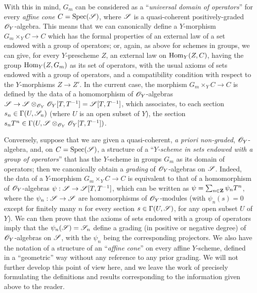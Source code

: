 \begin{remark}[8.3.9]
With this in mind, $G_m$ can be considered as a ``\emph{universal domain of operators}'' for every \emph{affine cone} $C=\operatorname{Spec}(\mathscr{S})$, where $\mathscr{S}$ is a quasi-coherent positively-graded $\mathscr{O}_Y$-algebra.
This means that we can canonically define a $Y$-morphism $G_m\times_Y C\to C$ which has the formal properties of an external law of a set endowed with a group of operators;
or, again, as above for schemes in groups, we can give, for every $Y$-prescheme $Z$, an external law on $\operatorname{Hom}_Y(Z,C)$, having the group $\operatorname{Hom}_Y(Z,G_m)$ as its set of operators, with the usual axioms of sets endowed with a group of operators, and a compatibility condition with respect to the $Y$-morphisms $Z\to Z'$.
In the current case, the morphism $G_m\times_Y C\to C$ is defined by the data of a homomorphism of $\mathscr{O}_Y$-algebras $\sh{S} \to \sh{S}\otimes_{\sh{O}_Y}\sh{O}_Y[T,T^{-1}] = \sh{S}[T,T^{-1}]$, which associates, to each section $s_n\in\Gamma(U,\mathscr{S}_n)$ (where $U$ is an open subset of $Y$), the section $s_n T^n\in\Gamma(U,\mathscr{S}\otimes_{\mathscr{O}_Y}\mathscr{O}_Y[T,T^{-1}])$.

Conversely, suppose that we are given a quasi-coherent, \emph{a priori non-graded}, $\mathscr{O}_Y$-algebra, and, on $C=\operatorname{Spec}(\mathscr{S})$, a structure of a ``\emph{$Y$-scheme in sets endowed with a group of operators}'' that has the $Y$-scheme in groups $G_m$ as its domain of operators;
then we canonically obtain a \emph{grading} of $\mathscr{O}_Y$-algebras on $\mathscr{S}$.
Indeed, the data of a $Y$-morphism $G_m\times_Y C\to C$ is equivalent to that of a homomorphism of $\mathscr{O}_Y$-algebras $\psi:\sh{S}\to\sh{S}[T,T^{-1}]$, which can be written as $\psi=\sum_{n\in\mathbf{Z}}\psi_n T^n$, where the $\psi_n:\sh{S}\to\sh{S}$ are homomorphisms of $\mathscr{O}_Y$-modules (with $\psi_n(s)=0$ except for finitely many $n$ for every section $s\in\Gamma(U,\mathscr{S})$, for any open subset $U$ of $Y$).
We can then prove that the axioms of sets endowed with a group of operators imply that the $\psi_n(\mathscr{S})=\mathscr{S}_n$ define a grading (in positive or negative degree) of $\mathscr{O}_Y$-algebras on $\mathscr{S}$, with the $\psi_n$ being the corresponding projectors.
We also have the notation of a structure of an ``\emph{affine cone}'' on every affine $Y$-scheme, defined in a ``geometric'' way without any reference to any prior grading.
We will not further develop this point of view here, and we leave the work of precisely formulating the definitions and results corresponding to the information given above to the reader.
\end{remark}



